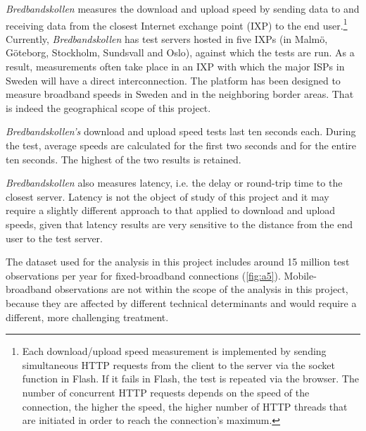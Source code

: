 \documentclass[12pt]{article}
\begin{document}
\textit{Bredbandskollen} measures the download and upload speed by sending data to and receiving data from the closest Internet exchange point (IXP) to the end user.\footnote{
Each download/upload speed measurement is implemented by sending simultaneous HTTP requests from the client to the server via the socket function in Flash. If it fails in Flash, the test is repeated via the browser. The number of concurrent HTTP requests depends on the speed of the connection, the higher the speed, the higher number of HTTP threads that are initiated in order to reach the connection's maximum.} Currently,  \textit{Bredbandskollen} has test servers hosted in five IXPs (in Malmö, Göteborg, Stockholm, Sundsvall and Oslo), against which the tests are run. As a result, measurements often take place in an IXP with which the major ISPs in Sweden will have a direct interconnection. The platform has been designed to measure broadband speeds in Sweden and in the neighboring border areas. That is indeed the geographical scope of this project. 

\textit{Bredbandskollen's} download and upload speed tests last ten seconds each. During the test, average speeds are calculated for the first two seconds and for the entire ten seconds. The highest of the two results is retained.  

\textit{Bredbandskollen} also measures latency, i.e. the delay or round-trip time to the closest server. Latency is not the object of study of this project and it may require a slightly different approach to that applied to download and upload speeds, given that latency results are very sensitive to the distance from the end user to the test server.     

The dataset used for the analysis in this project includes around 15 million test observations per year for fixed-broadband connections (\autoref{fig:a5}). Mobile-broadband observations are not within the scope of the analysis in this project, because they are affected by different technical determinants and would require a different, more challenging treatment.
\end{document}
